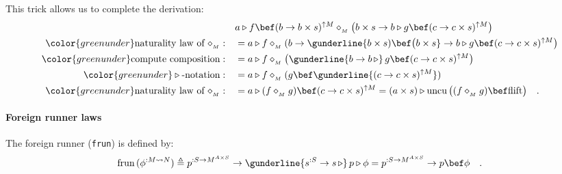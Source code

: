 This trick allows us to complete the derivation:
\begin{align*}
 & a\triangleright f\bef(b\rightarrow b\times s)^{\uparrow M}\diamond_{_{M}}\big(b\times s\rightarrow b\triangleright g\bef(c\rightarrow c\times s)^{\uparrow M}\big)\\
{\color{greenunder}\text{naturality law of }\diamond_{_{M}}:}\quad & =a\triangleright f\diamond_{_{M}}(b\rightarrow\gunderline{b\times s)\bef\big(b\times s}\rightarrow b\triangleright g\bef(c\rightarrow c\times s)^{\uparrow M}\big)\\
{\color{greenunder}\text{compute composition}:}\quad & =a\triangleright f\diamond_{_{M}}\big(\gunderline{b\rightarrow b\,\triangleright}\,g\bef(c\rightarrow c\times s)^{\uparrow M}\big)\\
{\color{greenunder}\triangleright\text{-notation}:}\quad & =a\triangleright f\diamond_{_{M}}(g\bef\gunderline{(c\rightarrow c\times s)^{\uparrow M}})\\
{\color{greenunder}\text{naturality law of }\diamond_{_{M}}:}\quad & =a\triangleright(f\diamond_{_{M}}g)\bef(c\rightarrow c\times s)^{\uparrow M}=\left(a\times s\right)\triangleright\text{uncu}\,\big((f\diamond_{_{M}}g)\bef\text{flift}\big)\quad.
\end{align*}
 

\paragraph{Foreign runner laws}

The foreign runner (\lstinline!frun!) is defined by:
\[
\text{frun}\,(\phi^{:M\leadsto N})\triangleq p^{:S\rightarrow M^{A\times S}}\rightarrow\gunderline{s^{:S}\rightarrow s\,\triangleright}\,p\triangleright\phi=p^{:S\rightarrow M^{A\times S}}\rightarrow p\bef\phi\quad.
\]

